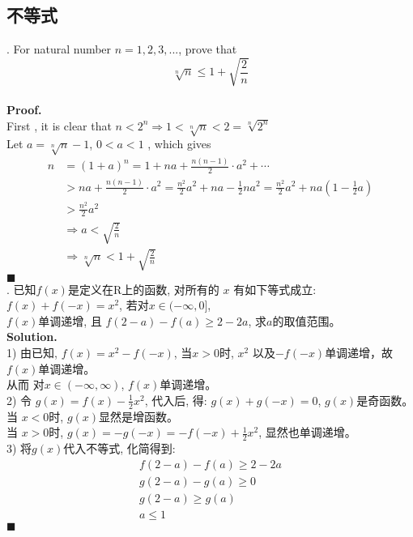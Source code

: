 \documentclass[UTF8]{article}
\begin{document}
\subsection{不等式}
. For natural number $n=1,2,3, ...$, prove that  $$ \sqrt[n]{n} \le 1 + \sqrt{\frac{2}{n}}$$  \\
\noindent \textbf{Proof.} \\
First , it is clear that $n < 2^n \Longrightarrow 1 < \sqrt[n]{n} < 2 = \sqrt[n]{2^n}$ \\
Let $ a = \sqrt[n]{n} -1 $,   $ 0<a<1 $ , which gives 
\begin{align*}
n & = (1+a)^n = 1 + na + \frac{n(n-1)}{2} \cdot a^2 + \cdots \\
& > na + \frac{n(n-1)}{2} \cdot a^2 = \frac{n^2}{2} a^2 + na - \frac{1}{2}na^2 = \frac{n^2}{2} a^2 + na(1-\frac{1}{2}a) \\
& > \frac{n^2}{2} a^2 \\
& \Longrightarrow a < \sqrt{\frac{2}{n}} \\
& \Longrightarrow \sqrt[n]{n} < 1 + \sqrt{\frac{2}{n}} 
\end{align*}
$\blacksquare$ \\

. 已知$f(x)$是定义在R上的函数, 对所有的 $x$ 有如下等式成立: $f(x) + f(-x) = x^2$, 若对$x \in (-\infty,0]$, \\
$f(x)$单调递增, 且 $f(2-a)-f(a) \geq 2-2a$, 求$a$的取值范围。 \\
\textbf{Solution.} \\
1) 由已知, $f(x) = x^2 - f(-x)$, 当$x>0$时, $x^2$ 以及$-f(-x)$单调递增，故$f(x)$单调递增。\\
从而 对$x\in (-\infty,\infty)$, $f(x)$单调递增。 \\
2) 令 $g(x)=f(x) - \frac{1}{2}x^2$, 代入后, 得: $g(x) + g(-x)=0$, $g(x)$是奇函数。\\
当 $x<0$时, $g(x)$显然是增函数。 \\
当 $x>0$时, $g(x) = -g(-x) = - f(-x) + \frac{1}{2}x^2$, 显然也单调递增。 \\
3) 将$g(x)$代入不等式, 化简得到: 
\begin{align*}
f(2-a)-f(a) \geq 2-2a \\
g(2-a) - g(a) \geq 0 \\
g(2-a) \geq g(a) \\
a \leq 1
\end{align*}
$\blacksquare$ \\
\end{document}
